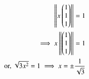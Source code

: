 \begin{align}
\left\lVert x\begin{pmatrix} 1 \\ 1\\ 1\end{pmatrix}\right\rVert= 1
\\
\implies x\left\lVert\begin{pmatrix} 1 \\ 1\\ 1\end{pmatrix}\right\rVert= 1
\\
\text{or, } \sqrt{3x^2}=1 \implies x = \pm \frac{1}{\sqrt{3}}
\end{align}
